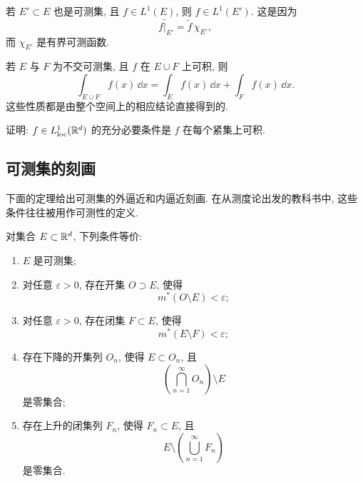 若 \(E'\subset E\) 也是可测集, 且 \(f\in L^1(E)\), 则 \(f\in L^1(E')\). 这是因为
\[
\widetilde{f|_{E'}}=\widetilde f\,\chi_{E'},
\]
而 \(\chi_{E'}\) 是有界可测函数.

若 \(E\) 与 \(F\) 为不交可测集, 且 \(f\) 在 \(E\cup F\) 上可积, 则
\[
\int_{E\cup F}f(x)\,\dd x
=
\int_E f(x)\,\dd x+
\int_F f(x)\,\dd x.
\]
这些性质都是由整个空间上的相应结论直接得到的.

\begin{exer}\label{exer:lloc-iff-integrable-on-compact}
	证明: \(f\in L^1_{\operatorname{loc}}(\mathbb{R}^d)\) 的充分必要条件是 \(f\) 在每个紧集上可积.
\end{exer}

\subsection{可测集的刻画}

下面的定理给出可测集的外逼近和内逼近刻画. 在从测度论出发的教科书中, 这些条件往往被用作可测性的定义.

\begin{thm}\label{thm:measurable-set-characterizations}
	对集合 \(E\subset\mathbb{R}^d\), 下列条件等价:
	\begin{enumerate}
		\item \(E\) 是可测集;
		\item 对任意 \(\varepsilon>0\), 存在开集 \(O\supset E\), 使得
		\[
		m^*(O\setminus E)<\varepsilon;
		\]
		\item 对任意 \(\varepsilon>0\), 存在闭集 \(F\subset E\), 使得
		\[
		m^*(E\setminus F)<\varepsilon;
		\]
		\item 存在下降的开集列 \(O_n\), 使得 \(E\subset O_n\), 且
		\[
		\left(\bigcap_{n=1}^{\infty}O_n\right)\setminus E
		\]
		是零集合;
		\item 存在上升的闭集列 \(F_n\), 使得 \(F_n\subset E\), 且
		\[
		E\setminus\left(\bigcup_{n=1}^{\infty}F_n\right)
		\]
		是零集合.
	\end{enumerate}
\end{thm}


